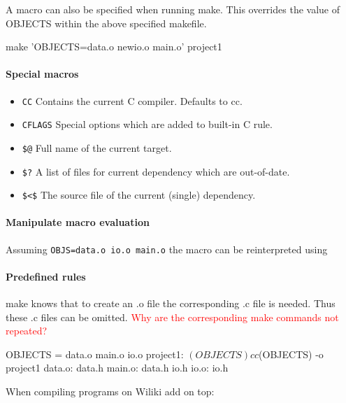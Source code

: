 \documentclass[10pt,a4paper]{scrartcl}
\begin{document}
\begin{multicols*}{2}
A macro can also be specified when running make. This overrides the value of OBJECTS within the above specified makefile.

\begin{TPCpp}
make 'OBJECTS=data.o newio.o main.o' project1
\end{TPCpp}

\paragraph{Special macros}

\begin{itemize}
\item \verb+CC+ Contains the current C compiler. Defaults to cc.
\item \verb+CFLAGS+ Special options which are added to built-in C rule.
\item \verb+$@+ Full name of the current target.
\item \verb+$?+ A list of files for current dependency which are out-of-date.
\item \verb+$<$+ The source file of the current (single) dependency.
\end{itemize}

\paragraph{Manipulate macro evaluation}

Assuming \verb+OBJS=data.o io.o main.o+ the macro can be reinterpreted using


\paragraph{Predefined rules}

make knows that to create an .o file the corresponding .c file is needed. Thus these .c files can be omitted. \textcolor{red}{Why are the corresponding make commands not repeated?}

\begin{TPCpp}
OBJECTS = data.o main.o io.o
project1: $(OBJECTS)
	cc $(OBJECTS) -o project1
data.o: data.h
main.o: data.h io.h
io.o: io.h
\end{TPCpp}

When compiling programs on Wiliki add on top:


\end{multicols*}
\end{document}
